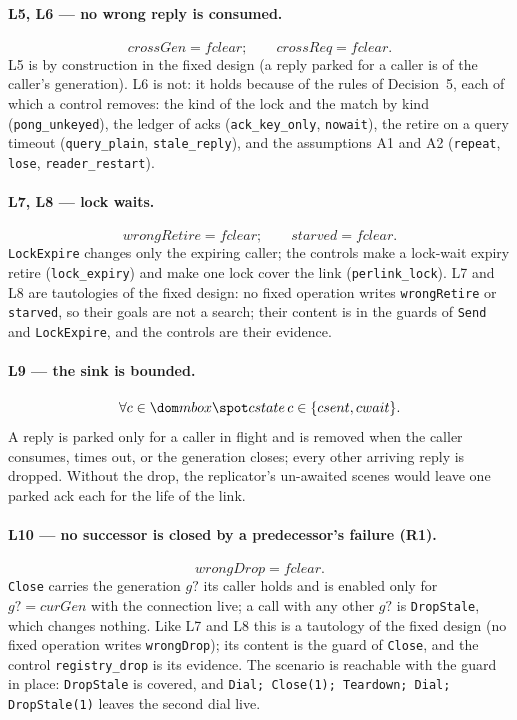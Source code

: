 \documentclass[a4paper,10pt,fleqn]{article}
\begin{document}
\paragraph{L5, L6 --- no wrong reply is consumed.}
\[ crossGen = fclear;\qquad crossReq = fclear. \]
L5 is by construction in the fixed design (a reply parked for a caller is of
the caller's generation).  L6 is not: it holds because of the rules of
Decision~5, each of which a control removes: the kind of the lock and the
match by kind (\texttt{pong\_unkeyed}), the ledger of acks
(\texttt{ack\_key\_only}, \texttt{nowait}), the retire on a query timeout
(\texttt{query\_plain}, \texttt{stale\_reply}), and the assumptions A1
and A2 (\texttt{repeat}, \texttt{lose}, \texttt{reader\_restart}).

\paragraph{L7, L8 --- lock waits.}
\[ wrongRetire = fclear;\qquad starved = fclear. \]
\texttt{LockExpire} changes only the expiring caller; the controls make a
lock-wait expiry retire (\texttt{lock\_expiry}) and make one lock cover the link
(\texttt{perlink\_lock}).  L7 and L8 are tautologies of the fixed design:
no fixed operation writes \texttt{wrongRetire} or \texttt{starved}, so their goals are not a
search; their content is in the guards of \texttt{Send} and \texttt{LockExpire}, and the
controls are their evidence.

\paragraph{L9 --- the sink is bounded.}
\[ \forall c \in \dom mbox \spot cstate\,c \in \{csent, cwait\}. \]
A reply is parked only for a caller in flight and is removed when the caller
consumes, times out, or the generation closes; every other arriving reply is
dropped.  Without the drop, the replicator's un-awaited scenes would leave one
parked ack each for the life of the link.

\paragraph{L10 --- no successor is closed by a predecessor's failure (R1).}
\[ wrongDrop = fclear. \]
\texttt{Close} carries the generation $g?$ its caller holds and is enabled only
for $g? = curGen$ with the connection live; a call with any other $g?$ is
\texttt{DropStale}, which changes nothing.  Like L7 and L8 this is a
tautology of the fixed design (no fixed operation writes \texttt{wrongDrop});
its content is the guard of \texttt{Close}, and the control
\texttt{registry\_drop} is its evidence.  The scenario is reachable with the
guard in place: \texttt{DropStale} is covered, and \texttt{Dial; Close(1);
Teardown; Dial; DropStale(1)} leaves the second dial live.
\end{document}
